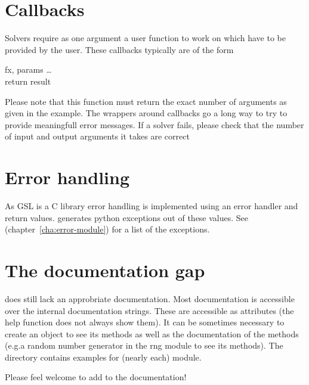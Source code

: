 \section{Callbacks}

Solvers require as one argument a user function to work on which have to be provided by the
user. These callbacks typically are of the form
\begin{funcdesc}{f}{x, params}
  \dots\\
  return result
\end{funcdesc}
Please note that this function must return the exact number of arguments
as given in the example. The wrappers around callbacks go a long way to try to provide
meaningfull error messages. If a solver fails, please check that the number of input and 
output arguments it takes are correct

\section{Error handling}
As GSL is a C library error handling is implemented using an error handler and return values.
\pygsl{} generates python exceptions out of these values. See  
(chapter~\ref{cha:error-module}) for a list of the exceptions.

\section{The documentation gap}

\pygsl{} does still lack an approbriate documentation. Most documentation is accessible over
the internal documentation strings. These are accessible as  attributes (the help
function does not always show them).  It can be sometimes necessary to create an 
object to see its methods as well as the documentation of the methods
 (e.g.a random number generator in the rng module to see its methods). 
The  directory contains examples for (nearly each) module.

Please feel welcome to add to the documentation!

